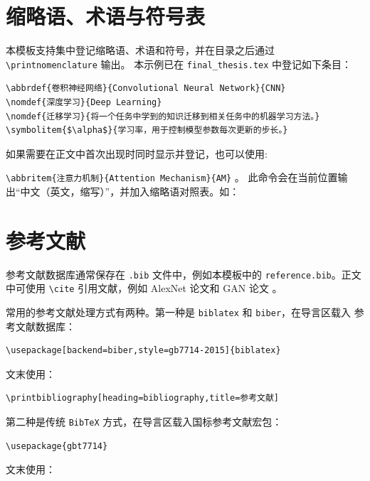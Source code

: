 \section{缩略语、术语与符号表}

本模板支持集中登记缩略语、术语和符号，并在目录之后通过 \verb|\printnomenclature| 输出。
本示例已在 \texttt{final\_thesis.tex} 中登记如下条目：

\begin{verbatim}
\abbrdef{卷积神经网络}{Convolutional Neural Network}{CNN}
\nomdef{深度学习}{Deep Learning}
\nomdef{迁移学习}{将一个任务中学到的知识迁移到相关任务中的机器学习方法。}
\symbolitem{$\alpha$}{学习率，用于控制模型参数每次更新的步长。}
\end{verbatim}

如果需要在正文中首次出现时同时显示并登记，也可以使用:

\verb|\abbritem{注意力机制}{Attention Mechanism}{AM}|
。
此命令会在当前位置输出“中文（英文，缩写）”，并加入缩略语对照表。如：

\section{参考文献}

参考文献数据库通常保存在 \texttt{.bib} 文件中，例如本模板中的
\texttt{reference.bib}。正文中可使用 \verb|\cite| 引用文献，例如 AlexNet 论文和 GAN
论文 \cite{krizhevsky2012imagenet,goodfellow2014generative}。

常用的参考文献处理方式有两种。第一种是 \texttt{biblatex} 和 \texttt{biber}，在导言区载入
参考文献数据库：

\begin{verbatim}
\usepackage[backend=biber,style=gb7714-2015]{biblatex}

\end{verbatim}

文末使用：

\begin{verbatim}
\printbibliography[heading=bibliography,title=参考文献]
\end{verbatim}

第二种是传统 \texttt{BibTeX} 方式，在导言区载入国标参考文献宏包：

\begin{verbatim}
\usepackage{gbt7714}
\end{verbatim}

文末使用：

\begin{verbatim}


\end{verbatim}

